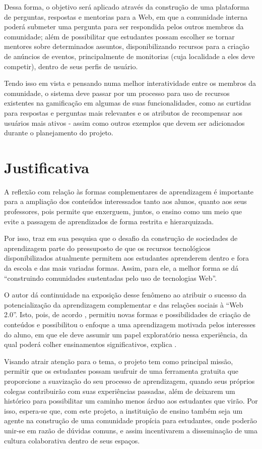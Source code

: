 Dessa forma, o objetivo será aplicado através da construção de uma plataforma de perguntas, respostas e mentorias para a Web, em que a comunidade interna poderá submeter uma pergunta para ser respondida pelos outros membros da comunidade; além de possibilitar que estudantes possam escolher se tornar mentores sobre determinados assuntos, disponibilizando recursos para a criação de anúncios de eventos, principalmente de monitorias (cuja localidade a eles deve competir), dentro de seus perfis de usuário. 

Tendo isso em vista e pensando numa melhor interatividade entre os membros da comunidade, o sistema deve passar por um processo para uso de recursos existentes na \gls{gamificação} em algumas de suas funcionalidades, como as curtidas para respostas e perguntas mais relevantes e os atributos de recompensar aos usuários mais ativos  - assim como outros exemplos que devem ser adicionados durante o planejamento do projeto.

\section{Justificativa}
A reflexão com relação às formas complementares de aprendizagem é importante para a ampliação dos conteúdos interessados tanto aos alunos, quanto aos seus professores, pois permite que enxerguem, juntos, o ensino como um meio que evite a passagem de aprendizados de forma restrita e hierarquizada.

Por isso,  traz em sua pesquisa que o desafio da construção de sociedades de aprendizagem parte do pressuposto de que os recursos tecnológicos disponibilizados atualmente permitem aos estudantes aprenderem dentro e fora da escola e das mais variadas formas. Assim, para ele, a melhor forma se dá ``construindo comunidades sustentadas pelo uso de tecnologias Web''.

O autor dá continuidade na exposição desse fenômeno ao atribuir o sucesso da potencialização da aprendizagem complementar e das relações sociais à ``Web 2.0''. Isto, pois, de acordo , permitiu novas formas e possibilidades de criação de conteúdos e possibilitou o enfoque a uma aprendizagem motivada pelos interesses do aluno, em que ele deve assumir um papel exploratório nessa experiência, da qual poderá colher ensinamentos significativos, explica .

Visando atrair atenção para o tema, o projeto tem como principal missão, permitir que os estudantes possam usufruir de uma ferramenta gratuita que proporcione a suavização do seu processo de aprendizagem, quando seus próprios colegas contribuirão com suas experiências passadas, além de deixarem um histórico para possibilitar um caminho menos árduo aos estudantes que virão. Por isso, espera-se que, com este projeto, a instituição de ensino também seja um agente na construção de uma comunidade propícia para estudantes, onde poderão unir-se em razão de dúvidas comuns, e assim incentivarem a disseminação de uma cultura colaborativa dentro de seus espaços.


